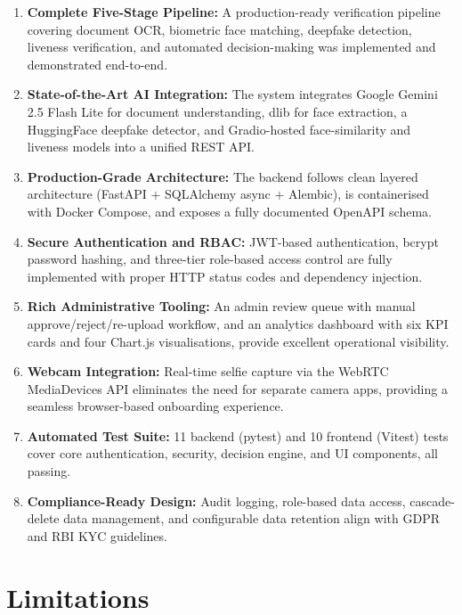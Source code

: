 \begin{enumerate}
    \item \textbf{Complete Five-Stage Pipeline:} A production-ready verification pipeline covering document OCR, biometric face matching, deepfake detection, liveness verification, and automated decision-making was implemented and demonstrated end-to-end.

    \item \textbf{State-of-the-Art AI Integration:} The system integrates Google Gemini 2.5 Flash Lite for document understanding, dlib for face extraction, a HuggingFace deepfake detector, and Gradio-hosted face-similarity and liveness models into a unified REST API.

    \item \textbf{Production-Grade Architecture:} The backend follows clean layered architecture (FastAPI + SQLAlchemy async + Alembic), is containerised with Docker Compose, and exposes a fully documented OpenAPI schema.

    \item \textbf{Secure Authentication and RBAC:} JWT-based authentication, bcrypt password hashing, and three-tier role-based access control are fully implemented with proper HTTP status codes and dependency injection.

    \item \textbf{Rich Administrative Tooling:} An admin review queue with manual approve/reject/re-upload workflow, and an analytics dashboard with six KPI cards and four Chart.js visualisations, provide excellent operational visibility.

    \item \textbf{Webcam Integration:} Real-time selfie capture via the WebRTC MediaDevices API eliminates the need for separate camera apps, providing a seamless browser-based onboarding experience.

    \item \textbf{Automated Test Suite:} 11 backend (pytest) and 10 frontend (Vitest) tests cover core authentication, security, decision engine, and UI components, all passing.

    \item \textbf{Compliance-Ready Design:} Audit logging, role-based data access, cascade-delete data management, and configurable data retention align with GDPR and RBI KYC guidelines.
\end{enumerate}

\section{Limitations}

